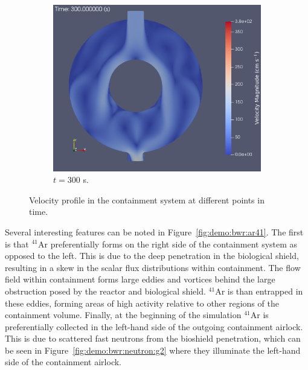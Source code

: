 \begin{figure}[H]
\begin{subfigure}[b]{0.495\textwidth}
    \end{subfigure}
    \hfill
    \begin{subfigure}[b]{0.495\textwidth}
        \centering
        \includegraphics[width=\textwidth]{images/demos/bwr_shield/vel/vel_300s.png}
        \caption{$t = 300$ s.}
        \label{fig:demo:bwr:vel:300}
    \end{subfigure}
    \caption{Velocity profile in the containment system at different points in time.}
    \label{fig:demo:bwr:vel}
\end{figure}

Several interesting features can be noted in Figure~\ref{fig:demo:bwr:ar41}. The first is that $\mathrm{^{41}Ar}$ preferentially forms on the right side of the containment system as opposed to the left. This is due to the deep penetration in the biological shield, resulting in a skew in the scalar flux distributions within containment. The flow field within containment forms large eddies and vortices behind the large obstruction posed by the reactor and biological shield. $\mathrm{^{41}Ar}$ is than entrapped in these eddies, forming areas of high activity relative to other regions of the containment volume. Finally, at the beginning of the simulation $\mathrm{^{41}Ar}$ is preferentially collected in the left-hand side of the outgoing containment airlock. This is due to scattered fast neutrons from the bioshield penetration, which can be seen in Figure~\ref{fig:demo:bwr:neutron:g2} where they illuminate the left-hand side of the containment airlock. 

